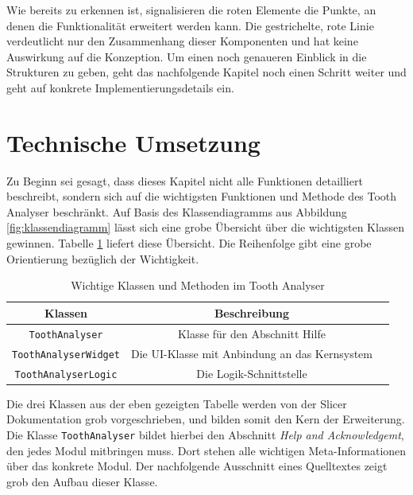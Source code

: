 Wie bereits zu erkennen ist, signalisieren die roten Elemente die Punkte, an denen
die Funktionalität erweitert werden kann. Die gestrichelte, rote Linie verdeutlicht
nur den Zusammenhang dieser Komponenten und hat keine Auswirkung auf die Konzeption.
Um einen noch genaueren Einblick in die Strukturen zu geben, geht das nachfolgende
Kapitel noch einen Schritt weiter und geht auf konkrete Implementierungsdetails ein.

\pagebreak

\section{Technische Umsetzung}
\label{sec:technische_umsetzung} Zu Beginn sei gesagt, dass dieses Kapitel nicht
alle Funktionen detailliert beschreibt, sondern sich auf die wichtigsten
Funktionen und Methode des Tooth Analyser beschränkt. Auf Basis des Klassendiagramms
aus Abbildung \ref{fig:klassendiagramm} lässt sich eine grobe Übersicht über die
wichtigsten Klassen gewinnen. Tabelle \ref{tab:methoden_klassen} liefert diese
Übersicht. Die Reihenfolge gibt eine grobe Orientierung bezüglich der Wichtigkeit.

\begin{table}[h]
	\centering
	\begin{tabular}{|c|c|c|}
		\hline
		\textbf{Klassen}             & \textbf{Beschreibung}                              \\
		\hline
		\texttt{ToothAnalyser}       & Klasse für den Abschnitt Hilfe                     \\
		\hline
		\texttt{ToothAnalyserWidget} & Die \ac{UI}-Klasse mit Anbindung an das Kernsystem \\
		\hline
		\texttt{ToothAnalyserLogic}  & Die Logik-Schnittstelle                            \\
		\hline
	\end{tabular}
	\caption{Wichtige Klassen und Methoden im Tooth Analyser}
	\label{tab:methoden_klassen}
\end{table}

Die drei Klassen aus der eben gezeigten Tabelle werden von der Slicer
Dokumentation grob vorgeschrieben, und bilden somit den Kern der Erweiterung.
Die Klasse \texttt{ToothAnalyser} bildet hierbei den Abschnitt \textit{Help and
Acknowledgemt}, den jedes Modul mitbringen muss. Dort stehen alle wichtigen Meta-Informationen
über das konkrete Modul. Der nachfolgende Ausschnitt eines Quelltextes zeigt grob
den Aufbau dieser Klasse.

